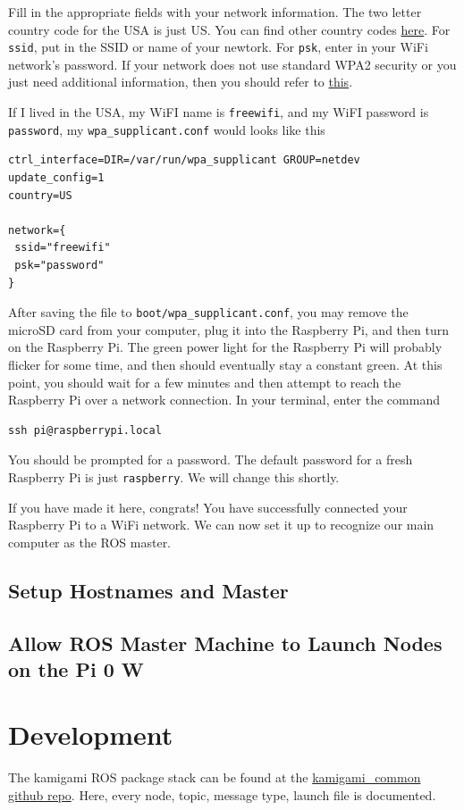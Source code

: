 \documentclass[11pt]{article}
\begin{document}
Fill in the appropriate fields with your network information. The two letter country code for the USA is just US. You can find other country codes \href{https://en.wikipedia.org/wiki/ISO_3166-1}{here}. For \verb|ssid|, put in the SSID or name of your newtork. For \verb|psk|, enter in your WiFi network's password. If your network does not use standard WPA2 security or you just need additional information, then you should refer to \href{https://www.raspberrypi.org/documentation/configuration/wireless/wireless-cli.md}{this}.
\newline
\vspace{2mm}

If I lived in the USA, my WiFI name is \verb|freewifi|, and my WiFI password is \verb|password|, my \verb|wpa_supplicant.conf| would looks like this
\begin{verbatim}
ctrl_interface=DIR=/var/run/wpa_supplicant GROUP=netdev
update_config=1
country=US

network={
 ssid="freewifi"
 psk="password"
}
\end{verbatim}
After saving the file to \verb|boot/wpa_supplicant.conf|, you may remove the microSD card from your computer, plug it into the Raspberry Pi, and then turn on the Raspberry Pi. The green power light for the Raspberry Pi will probably flicker for some time, and then should eventually stay a constant green. At this point, you should wait for a few minutes and then attempt to reach the Raspberry Pi over a network connection. In your terminal, enter the command

\begin{verbatim}
ssh pi@raspberrypi.local
\end{verbatim}

You should be prompted for a password. The default password for a fresh Raspberry Pi is just \verb|raspberry|. We will change this shortly.
\newline
\vspace{2mm}

If you have made it here, congrats! You have successfully connected your Raspberry Pi to a WiFi network. We can now set it up to recognize our main computer as the ROS master.

\subsection{Setup Hostnames and Master}

\subsection{Allow ROS Master Machine to Launch Nodes on the Pi 0 W}

\section{Development}

The kamigami ROS package stack can be found at the \href{https://github.com/BML-MultiRobot/kamigami_common}{kamigami\_common github repo}. Here, every node, topic, message type, launch file is documented.
\end{document}
